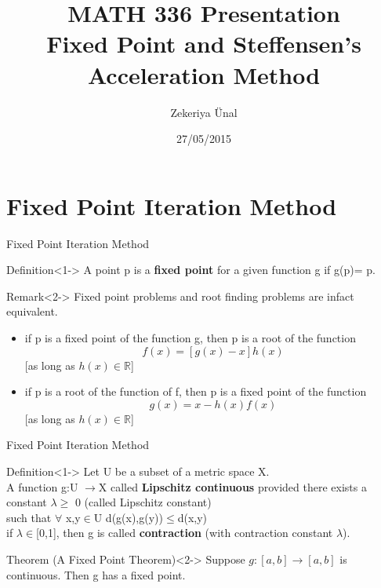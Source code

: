 \documentclass{beamer}
\title[Fixed Point and Steffensen's Acceleration]{MATH 336 Presentation \\Fixed Point and Steffensen's Acceleration Method}
\author{Zekeriya Ünal}
\institute{Boğaziçi University}
\date{27/05/2015}
\begin{document}
\begin{frame}
  \titlepage
\end{frame}


\begin{frame}[plain]
	\tableofcontents
\end{frame}

\section{Fixed Point Iteration Method}

\begin{frame}{Fixed Point Iteration Method}

  \begin{block}{Definition}<1->
A point p is a \textbf{fixed point} for a given function g if g(p)= p.
\end{block}
 \begin{block}{Remark}<2->
 Fixed point problems and root finding problems are infact equivalent.
 \begin{itemize}
\item<1->if p is a fixed point of the function g, then p is a root of the function
$$f(x)=[g(x)-x]h(x)$$ [as long as $h(x)\in \mathbb{R}$]
\item<2->if p is a root of the function of f, then p is a fixed point of the function 
$$g(x)=x-h(x)f(x)$$ [as long as $h(x)\in \mathbb{R}$]
\end{itemize}
\end{block}
 \end{frame}
 \begin{frame}{Fixed Point Iteration Method}

 \begin{block}{Definition}<1->
Let U be a subset of a metric space X.
\\A function g:U $\rightarrow$X called \textbf{Lipschitz continuous} provided there exists a constant $\lambda\ge$ 0 (called Lipschitz constant)
\\such that $\forall$ x,y$\in$U d(g(x),g(y))$\le$d(x,y)
\\if $\lambda\in$[0,1], then g is called \textbf{contraction} (with contraction constant $\lambda$).
\end{block} 
 \begin{block}{Theorem (A Fixed Point Theorem)}<2->
 Suppose $g:[a,b]\rightarrow[a,b]$ is continuous. Then g has a fixed point.
 

\end{block}
\end{frame}
\end{document}
